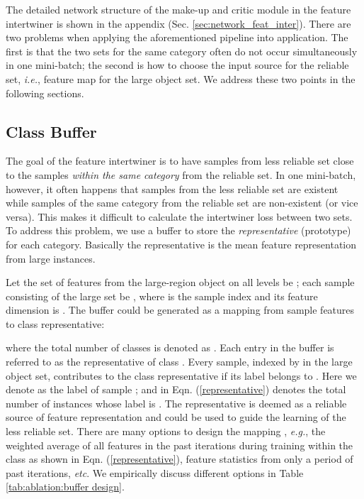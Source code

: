 \documentclass{article} \usepackage{iclr2019_conference,times}
\begin{document}
The detailed network structure of the make-up and critic module in the feature intertwiner is shown in the appendix (Sec. \ref{sec:network_feat_inter}). There are two problems when applying the aforementioned pipeline into application. The first is that the two sets for the same category often do not occur simultaneously in one mini-batch; the second is how to choose the input source for the reliable set, \textit{i.e.}, feature map  for the large object set. We address these two points in the following sections.





\subsection{Class Buffer}
The goal of the feature intertwiner is to have samples from less reliable set close to the samples \emph{within the same category} from the reliable set.
In one mini-batch, however, it often happens that samples from the less reliable set are existent while samples of the same category from the reliable set are non-existent (or vice versa). This makes it difficult to calculate the intertwiner loss between two sets.
To address this problem, we use a  {buffer} 
to store the \textit{representative} (prototype) for each category. Basically the representative is the mean feature representation  from large instances.

Let the set of features from the large-region object on all levels be ;
each sample consisting of the large set  be , where  is the sample index and its feature dimension is .
The buffer could be generated as a mapping from sample features to class representative:

where the total number of classes is denoted as .
Each entry  in the buffer  is referred to as the representative of class . Every sample, indexed by  in the large object set, contributes to the class representative  if its label belongs to .
Here we denote  as the label of sample ;
and  in Eqn. (\ref{representative}) denotes the total number of instances whose label is .
The representative is deemed as a reliable source of feature representation and could be used to guide the learning of the less reliable set.
There are many options to design the mapping , \textit{e.g.}, the weighted average of 
all features in the past iterations during training within the class 
as shown in Eqn. (\ref{representative}), feature statistics from only a period of past iterations, \textit{etc}. We empirically 
discuss different options in Table \ref{tab:ablation:buffer design}. 
\end{document}
